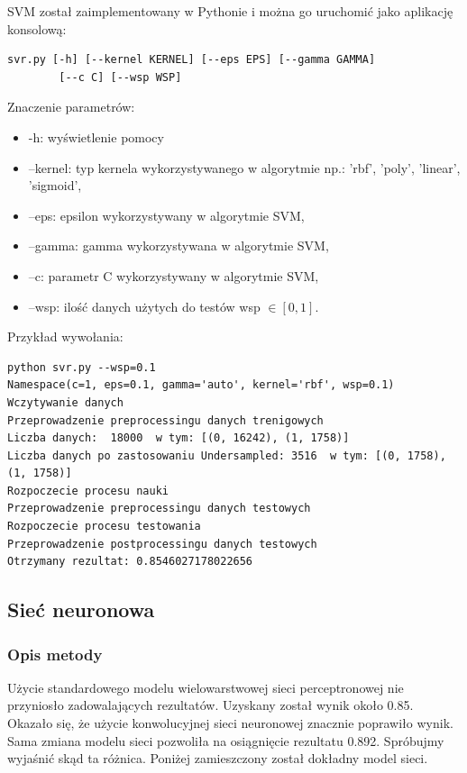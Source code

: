\documentclass[12pt]{article}
\begin{document}
SVM został zaimplementowany w Pythonie i można go uruchomić jako aplikację konsolową:

\begin{lstlisting}
svr.py [-h] [--kernel KERNEL] [--eps EPS] [--gamma GAMMA] 
		[--c C] [--wsp WSP]
\end{lstlisting}

Znaczenie parametrów:

\begin{itemize}
    \item -h: wyświetlenie pomocy
    \item --kernel: typ kernela wykorzystywanego w algorytmie np.: 'rbf', 'poly', 'linear', 'sigmoid',
    \item --eps: epsilon wykorzystywany w algorytmie SVM,
    \item --gamma: gamma wykorzystywana w algorytmie SVM,
    \item --c: parametr C wykorzystywany w algorytmie SVM,
    \item --wsp: ilość danych użytych do testów wsp $\in [0,1]$.
\end{itemize}
\newpage
Przykład wywołania:
\begin{lstlisting}
python svr.py --wsp=0.1
Namespace(c=1, eps=0.1, gamma='auto', kernel='rbf', wsp=0.1)
Wczytywanie danych
Przeprowadzenie preprocessingu danych trenigowych
Liczba danych:  18000  w tym: [(0, 16242), (1, 1758)]
Liczba danych po zastosowaniu Undersampled: 3516  w tym: [(0, 1758), (1, 1758)]
Rozpoczecie procesu nauki
Przeprowadzenie preprocessingu danych testowych
Rozpoczecie procesu testowania
Przeprowadzenie postprocessingu danych testowych
Otrzymany rezultat: 0.8546027178022656
\end{lstlisting}


\subsection{Sieć neuronowa}

\subsubsection{Opis metody}
Użycie standardowego modelu wielowarstwowej sieci perceptronowej nie przyniosło zadowalających rezultatów. Uzyskany został wynik około 0.85. Okazało się, że użycie konwolucyjnej sieci neuronowej znacznie poprawiło wynik. Sama zmiana modelu sieci pozwoliła na osiągnięcie rezultatu 0.892. Spróbujmy wyjaśnić skąd ta różnica. Poniżej zamieszczony został dokładny model sieci.
\end{document}
